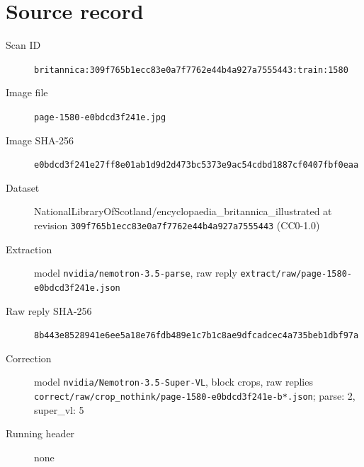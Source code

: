 \documentclass{article}
\begin{document}
\section*{Source record}
\begin{description}
\item[Scan ID] \texttt{britannica:309f765b1ecc83e0a7f7762e44b4a927a7555443:train:1580}
\item[Image file] \texttt{page-1580-e0bdcd3f241e.jpg}
\item[Image SHA-256] \texttt{e0bdcd3f241e27ff8e01ab1d9d2d473bc5373e9ac54cdbd1887cf0407fbf0eaa}
\item[Dataset] NationalLibraryOfScotland/encyclopaedia\_britannica\_illustrated at revision \texttt{309f765b1ecc83e0a7f7762e44b4a927a7555443} (CC0-1.0)
\item[Extraction] model \texttt{nvidia/nemotron-3.5-parse}, raw reply \texttt{extract/raw/page-1580-e0bdcd3f241e.json}
\item[Raw reply SHA-256] \texttt{8b443e8528941e6ee5a18e76fdb489e1c7b1c8ae9dfcadcec4a735beb1dbf97a}
\item[Correction] model \texttt{nvidia/Nemotron-3.5-Super-VL}, block crops, raw replies \texttt{correct/raw/crop\_nothink/page-1580-e0bdcd3f241e-b*.json}; parse: 2, super\_vl: 5
\item[Running header] none
\end{description}
\end{document}

